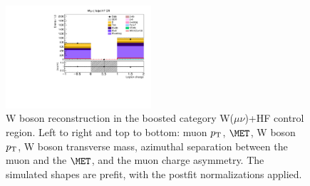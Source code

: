 \begin{figure}[tbp]
\begin{center}
    \includegraphics[width=0.48\textwidth]{figures/wlnhbb2016/boosted/WmnWHHeavyFlavorFJCR_lepton1Charge.pdf}
    \caption{W boson reconstruction in the boosted category W($\mu\nu$)+HF control region.
    Left to right and top to bottom: muon $p_{\mathrm{T}}$, $\MET$, W boson $p_{\mathrm{T}}$, W boson transverse mass,
    azimuthal separation between the muon and the $\MET$, and the muon charge asymmetry.
    The simulated shapes are prefit, with the postfit normalizations applied.}
    \label{fig:boost_WmnHF_WBosons}
  \end{center}
\end{figure}
\clearpage

